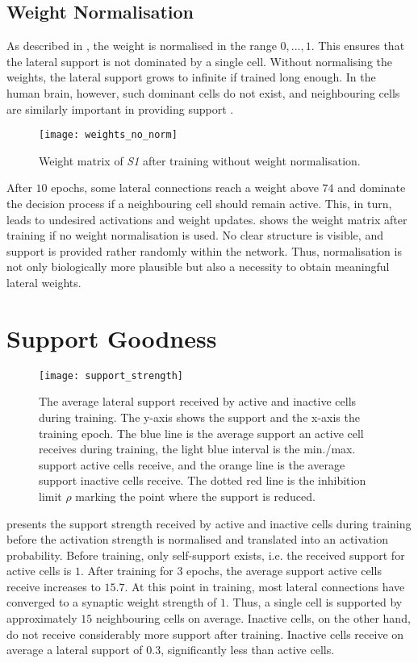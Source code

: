 \subsection{Weight Normalisation}
As described in , the weight is normalised in the range $0, ..., 1$.
This ensures that the lateral support is not dominated by a single cell.
Without normalising the weights, the lateral support grows to infinite if trained long enough.
In the human brain, however, such dominant cells do not exist, and neighbouring cells are similarly important in providing support .


\begin{figure}[h]
    \centering
    \texttt{[image: weights\_no\_norm]}
    \caption[Weights after training without normalisation]{Weight matrix of \emph{S1} after training without weight normalisation.}
\end{figure}
%
After $10$ epochs, some lateral connections reach a weight above $74$ and dominate the decision process if a neighbouring cell should remain active.
This, in turn, leads to undesired activations and weight updates. 
 shows the weight matrix after training if no weight normalisation is used.
No clear structure is visible, and support is provided rather randomly within the network.
Thus, normalisation is not only biologically more plausible but also a necessity to obtain meaningful lateral weights.


\section{Support Goodness}
%
\begin{figure}[h]
    \centering
    \texttt{[image: support\_strength]}
    \caption[Average lateral support]{The average lateral support received by active and inactive cells during training. The y-axis shows the support and the x-axis the training epoch. The blue line is the average support an active cell receives during training, the light blue interval is the min./max. support active cells receive, and the orange line is the average support inactive cells receive. The dotted red line is the inhibition limit $\rho$ marking the point where the support is reduced.}
\end{figure}
%
 presents the support strength received by active and inactive cells during training before the activation strength is normalised and translated into an activation probability.
Before training, only self-support exists, i.e. the received support for active cells is $1$.
After training for $3$ epochs, the average support active cells receive increases to $15.7$.
At this point in training, most lateral connections have converged to a synaptic weight strength of $1$.
Thus, a single cell is supported by approximately $15$ neighbouring cells on average.
Inactive cells, on the other hand, do not receive considerably more support after training. Inactive cells receive on average a lateral support of $0.3$, significantly less than active cells.

